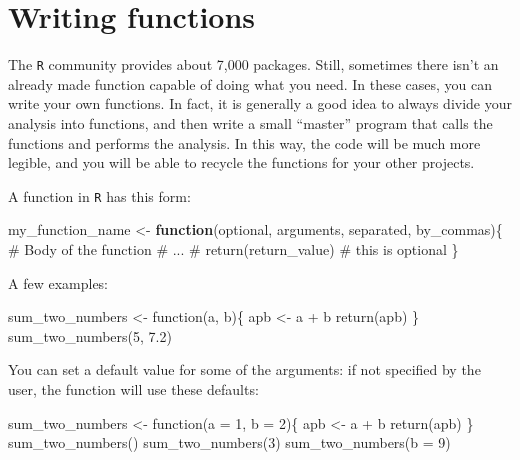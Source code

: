 \documentclass[
  letterpaper,
  DIV=11,
  numbers=noendperiod]{scrreprt}
\newenvironment{Shaded}{\begin{snugshade}}{\end{snugshade}}
\newcommand{\CommentTok}[1]{\textcolor[rgb]{0.37,0.37,0.37}{#1}}
\newcommand{\ControlFlowTok}[1]{\textcolor[rgb]{0.00,0.23,0.31}{\textbf{#1}}}
\newcommand{\FunctionTok}[1]{\textcolor[rgb]{0.28,0.35,0.67}{#1}}
\newcommand{\NormalTok}[1]{\textcolor[rgb]{0.00,0.23,0.31}{#1}}
\newcommand{\OtherTok}[1]{\textcolor[rgb]{0.00,0.23,0.31}{#1}}
\begin{document}
\section*{Writing functions}\label{writing-functions}


The \texttt{R} community provides about 7,000 packages. Still, sometimes
there isn't an already made function capable of doing what you need. In
these cases, you can write your own functions. In fact, it is generally
a good idea to always divide your analysis into functions, and then
write a small ``master'' program that calls the functions and performs
the analysis. In this way, the code will be much more legible, and you
will be able to recycle the functions for your other projects.

A function in \texttt{R} has this form:

\begin{Shaded}
\begin{Highlighting}[]
\NormalTok{my\_function\_name }\OtherTok{\textless{}{-}} \ControlFlowTok{function}\NormalTok{(optional, arguments, separated, by\_commas)\{}
  \CommentTok{\# Body of the function}
  \CommentTok{\# ...}
  \CommentTok{\# }
  \FunctionTok{return}\NormalTok{(return\_value) }\CommentTok{\# this is optional}
\NormalTok{\}}
\end{Highlighting}
\end{Shaded}

A few examples:

\begin{Shaded}
\begin{Highlighting}[]
\NormalTok{sum\_two\_numbers \textless{}{-} function(a, b)\{}
\NormalTok{  apb \textless{}{-} a + b  }
\NormalTok{  return(apb)}
\NormalTok{\}}
\NormalTok{sum\_two\_numbers(5, 7.2)}
\end{Highlighting}
\end{Shaded}

You can set a default value for some of the arguments: if not specified
by the user, the function will use these defaults:

\begin{Shaded}
\begin{Highlighting}[]
\NormalTok{sum\_two\_numbers \textless{}{-} function(a = 1, b = 2)\{}
\NormalTok{  apb \textless{}{-} a + b  }
\NormalTok{  return(apb)}
\NormalTok{\}}
\NormalTok{sum\_two\_numbers()}
\NormalTok{sum\_two\_numbers(3)}
\NormalTok{sum\_two\_numbers(b = 9)}
\end{Highlighting}
\end{Shaded}
\end{document}
